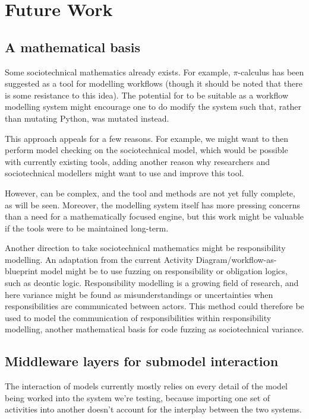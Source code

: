 \chapter{Future Work} %
\label{future_work_head}

\section{A mathematical basis}
Some sociotechnical mathematics already exists. For example, \(\pi\)-calculus has been suggested as a tool for modelling workflows\cite{Smith2003} (though it should be noted that there is some resistance to this idea\cite{Aalst2004}). The potential for \picalc to be suitable as a workflow modelling system might encourage one to do modify the system such that, rather than mutating Python, \picalc was mutated instead. \par

This approach appeals for a few reasons. For example, we might want to then perform model checking on the sociotechnical model, which would be possible with currently existing tools\cite{Tiu2005}, adding another reason why researchers and sociotechnical modellers might want to use and improve this tool. \par

However, \picalc can be complex, and the tool and methods are not yet fully complete, as will be seen. Moreover, the modelling system itself has more pressing concerns than a need for a mathematically focused engine, but this work might be valuable if the tools were to be maintained long-term. \par

Another direction to take sociotechnical mathematics might be responsibility modelling. An adaptation from the current Activity Diagram/workflow-as-blueprint model might be to use fuzzing on responsibility or obligation logics, such as deontic logic\cite{Hutchison2008}. Responsibility modelling is a growing field of research, and here variance might be found as misunderstandings or uncertainties when responsibilities are communicated between actors. This method could therefore be used to model the communication of responsibilities within responsibility modelling, another mathematical basis for code fuzzing as sociotechnical variance. \par

\section{Middleware layers for submodel interaction}
\label{middleware-layers}
The interaction of models currently mostly relies on every detail of the model being worked into the system we're testing, because importing one set of activities into another doesn't account for the interplay between the two systems. \par

